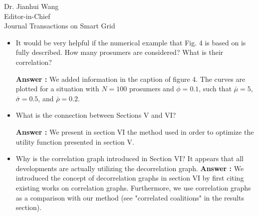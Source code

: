 \documentclass{letter}
\begin{document}
\begin{letter}{Dr. Jianhui Wang \\ Editor-in-Chief \\ Journal Transactions on Smart Grid }
\begin{itemize}
\begin{itemize}
That is, any agent is replaced by a mean approximation. In these conditions, we have :

\[ U(S) = \frac{ \bar{ \mu } }{ |S|^{\alpha -1} P^{MAX} } - \frac{ \sqrt(2) \bar{ \sigma } }{ |S|^{\alpha} P^{MAX} } \sqrt{|S| + \bar{ \rho } |S| ( |S| - 1 ) } \]

$ \bar{ \mu },\ \bar{ \sigma },\ \bar{ \rho }, and\ P^{MAX} $ are all constants in these very particular conditions, such that U is a function of the coalition size with a parameter $ \alpha $. Depending on $ \alpha $ (and $ \bar{ mu },\ \bar{ \sigma },\ \bar{ rho }, and\ P^{MAX} $), the utility function can have very different shapes.
\\
We find $\alpha^{\star} $ by solving :

\[ \left\{ \begin{array}{lll} \left| \frac{ \partial U }{ \partial |S| } \right|_{|S|=\bar{N}} = 0 \\ \left| \frac{ \partial^2 U }{ \partial |S|^2 } \right|_{\alpha = \alpha^{\star}} \leq 0 \end{array} \right. \]  

Solving this equation with a formal calculus software yields the equation of the paper.
\\
Please note, that we do not solve the coalition problem by taking the derivative of the utility function to be zero, we only use this in order to obtain a reasonable guess for $ \alpha $.
\\

		\item It would be very helpful if the numerical example that Fig. 4 is based on is fully described. How many prosumers are considered? What is their correlation?
		
		\textbf{Answer :} We added information in the caption of figure 4. The curves are plotted for a situation with $N=100$ prosumers and $ \phi = 0.1 $, such that $ \bar{\mu} = 5 $, $ \bar{\sigma} = 0.5 $, and $ \bar{\rho} = 0.2 $. 


		\item What is the connection between Sections V and VI?
		
		\textbf{Answer :} We present in section VI the method used in order to optimize the utility function presented in section V.

		\item Why is the correlation graph introduced in Section VI? It appears that all developments are actually utilizing the decorrelation graph.
		\textbf{Answer :} We introduced the concept of decorrelation graphs in section VI by first citing existing works on correlation graphs. Furthermore, we use correlation graphs as a comparison with our method (see "correlated coalitions" in  the results section). 
		

\end{itemize}
\end{itemize}
\end{letter}
\end{document}
